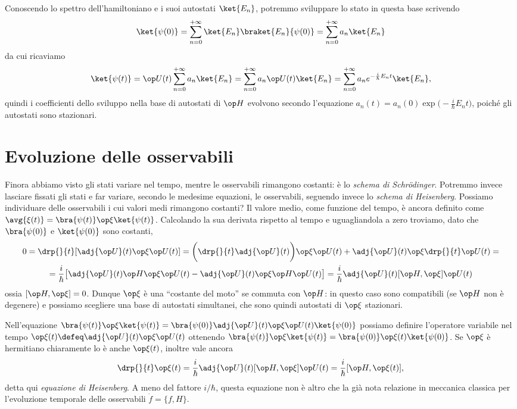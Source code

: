 Conoscendo lo spettro dell'hamiltoniano e i suoi autostati $\ket{E_n}$, potremmo sviluppare lo stato in questa base scrivendo
\begin{equation}
	\ket{\psi(0)}=\sum_{n=0}^{+\infty}\ket{E_n}\braket{E_n}{\psi(0)}=\sum_{n=0}^{+\infty}a_n\ket{E_n}
\end{equation}
da cui ricaviamo
\begin{equation}
	\ket{\psi(t)}=\op U(t)\sum_{n=0}^{+\infty}a_n\ket{E_n}=\sum_{n=0}^{+\infty}a_n\op U(t)\ket{E_n}=\sum_{n=0}^{+\infty}a_ne^{-\frac{i}{\hbar}E_nt}\ket{E_n},
\end{equation}
quindi i coefficienti dello sviluppo nella base di autostati di $\op H$ evolvono secondo l'equazione $a_n(t)=a_n(0)\exp\big(-\frac{i}{\hbar}E_nt\big)$, poich\'e gli autostati sono stazionari.

\section{Evoluzione delle osservabili}
Finora abbiamo visto gli stati variare nel tempo, mentre le osservabili rimangono costanti: è lo \emph{schema di Schr\"odinger}.
Potremmo invece lasciare fissati gli stati e far variare, secondo le medesime equazioni, le osservabili, seguendo invece lo \emph{schema di Heisenberg}.
Possiamo individuare delle osservabili i cui valori medi rimangono costanti?
Il valore medio, come funzione del tempo, è ancora definito come $\avg{\xi(t)}=\bra{\psi(t)}\op\xi\ket{\psi(t)}$.
Calcolando la sua derivata rispetto al tempo e uguagliandola a zero troviamo, dato che $\bra{\psi(0)}$ e $\ket{\psi(0)}$ sono costanti,
\begin{multline}
	0=\drp{}{t}[\adj{\op U}(t)\op\xi\op U(t)]=\bigg(\drp{}{t}\adj{\op U}(t)\bigg)\op\xi\op U(t)+\adj{\op U}(t)\op\xi\drp{}{t}\op U(t)=\\
	=\frac{i}{\hbar}\big[\adj{\op U}(t)\op H\op\xi\op U(t)-\adj{\op U}(t)\op\xi\op H\op U(t)\big]=\frac{i}{\hbar}\adj{\op U}(t)[\op H,\op\xi]\op U(t)
\end{multline}
ossia $[\op H,\op\xi]=0$.
Dunque $\op\xi$ è una ``costante del moto'' se commuta con $\op H$: in questo caso sono compatibili (se $\op H$ non è degenere) e possiamo scegliere una base di autostati simultanei, che sono quindi autostati di $\op\xi$ stazionari.

Nell'equazione $\bra{\psi(t)}\op\xi\ket{\psi(t)}=\bra{\psi(0)}\adj{\op U}(t)\op\xi\op U(t)\ket{\psi(0)}$ possiamo definire l'operatore variabile nel tempo $\op\xi(t)\defeq\adj{\op U}(t)\op\xi\op U(t)$ ottenendo $\bra{\psi(t)}\op\xi\ket{\psi(t)}=\bra{\psi(0)}\op\xi(t)\ket{\psi(0)}$.
Se $\op\xi$ è hermitiano chiaramente lo è anche $\op\xi(t)$, inoltre vale ancora
\begin{equation}
	\drp{}{t}\op\xi(t)=\frac{i}{\hbar}\adj{\op U}(t)[\op H,\op\xi]\op U(t)=\frac{i}{\hbar}[\op H,\op\xi(t)],
	\label{eq:evoluzione-osservabili-heisenberg}
\end{equation}
detta qui \emph{equazione di Heisenberg}.
A meno del fattore $i/\hbar$, questa equazione non è altro che la già nota relazione in meccanica classica per l'evoluzione temporale delle osservabili $\dot{f}=\{f,H\}$.

